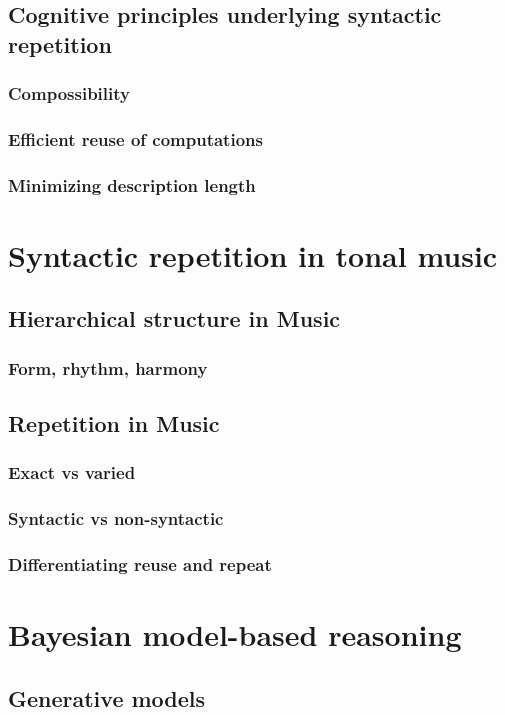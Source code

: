     \section{Cognitive principles underlying syntactic repetition}
        \subsection{Compossibility}
        \subsection{Efficient reuse of computations}
        \subsection{Minimizing description length}


\chapter{Syntactic repetition in tonal music}
    \section{Hierarchical structure in Music}
        \subsection{Form, rhythm, harmony}
    \section{Repetition in Music}
        \subsection{Exact vs varied}
        \subsection{Syntactic vs non-syntactic}
        \subsection{Differentiating reuse and repeat}


\chapter{Bayesian model-based reasoning}
    \section{Generative models}
